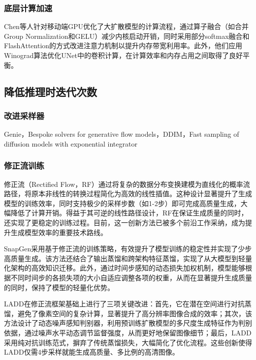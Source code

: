 \documentclass[11pt,a4paper,UTF8]{ctexart}
\begin{document}
\subsubsection{底层计算加速}

Chen等人\cite{chen2023speed}针对移动端GPU优化了大扩散模型的计算流程，通过算子融合（如合并Group Normalization\cite{wu2018group}和GELU\cite{hendrycks2016gaussian}）减少内核启动开销，同时采用部分softmax融合和FlashAttention\cite{dao2022flashattention}的方式改进注意力机制以提升内存带宽利用率。此外，他们应用Winograd算法\cite{alam2022winograd}优化UNet中的卷积计算，在计算效率和内存占用之间取得了良好平衡。




\subsection{降低推理时迭代次数}

\subsubsection{改进采样器}

Genie\cite{dockhorn2022genie}，Bespoke solvers for generative flow models\cite{shaul2023bespoke}，DDIM\cite{song2020denoising}，Fast sampling of diffusion models with exponential integrator\cite{zhang2022fast}

\subsubsection{修正流训练}

修正流（Rectified Flow，RF）通过将复杂的数据分布变换建模为直线化的概率流路径，将原本非线性的转换过程简化为高效的线性插值。这种设计显著提升了生成模型的训练效率，同时支持极少的采样步数（如1-2步）即可完成高质量生成，大幅降低了计算开销。得益于其可逆的线性路径设计，RF在保证生成质量的同时，还实现了更稳定的训练过程。目前，这一创新方法已被多个前沿工作采纳，成为提升生成模型效率的重要技术路线。

SnapGen\cite{hu2024snapgen}采用基于修正流的训练策略，有效提升了模型训练的稳定性并实现了少步高质量生成。该方法还结合了输出蒸馏和跨架构特征蒸馏，实现了从大模型到轻量化架构的高效知识迁移。此外，通过时间步感知的动态损失加权机制，模型能够根据不同时间步的各损失项的大小自适应调整各项的权重，从而在显著提升生成质量的同时，保持了模型的轻量化优势。

LADD\cite{sauer2024fast}在修正流框架基础上进行了三项关键改进：首先，它在潜在空间进行对抗蒸馏，避免了像素空间的复杂计算，显著提升了高分辨率图像合成的效率；其次，该方法设计了动态噪声感知判别器，利用预训练扩散模型的多尺度生成特征作为判别依据，通过噪声水平动态调节监督强度，从而更好地保留图像细节；最后，LADD采用纯对抗训练范式，摒弃了传统蒸馏损失，大幅简化了优化流程。这些创新使得LADD仅需4步采样就能生成高质量、多比例的高清图像。
\end{document}
